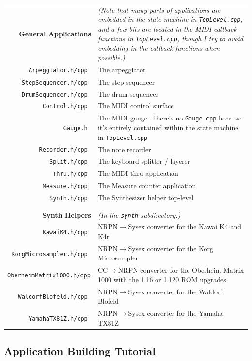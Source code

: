 \documentclass{article}
\begin{document}
\begin{tabular}{r@{\hspace{2em}}p{4.7in}}
	\bf General Applications  &		\it (Note that many parts of applications are embedded
				in the state machine in \texttt{TopLevel.cpp}, and a few bits
				are located in the MIDI callback functions in
				\texttt{TopLevel.cpp}, though I try to avoid embedding
				in the callback functions when possible.)\\
	\tt Arpeggiator.h/cpp & 	The arpeggiator \\ 
	\tt StepSequencer.h/cpp  & 	The step sequencer \\ 
	\tt DrumSequencer.h/cpp  & 	The drum sequencer \\ 
	\tt Control.h/cpp	& 	The MIDI control surface \\ 
	\tt Gauge.h	& 		The MIDI gauge.  There's no \texttt{Gauge.cpp} because it's
				entirely contained within the state machine in
				{\texttt{TopLevel.cpp}} \\ 
	\tt Recorder.h/cpp	& 	The note recorder \\ 
	\tt Split.h/cpp	 & 	The keyboard splitter / layerer \\ 
	\tt Thru.h/cpp & 		The MIDI thru application \\ 
	\tt Measure.h/cpp	& The Measure counter application \\ 
	\tt Synth.h/cpp	& The Synthesizer helper top-level \\ 
\\
\\
	\bf Synth Helpers  & \it (In the \texttt{synth} subdirectory.)\\
	\tt KawaiK4.h/cpp	& 	NRPN\(\rightarrow\)Sysex converter for the Kawai K4 and K4r\\ 
	\tt KorgMicrosampler.h/cpp	& 	NRPN\(\rightarrow\)Sysex converter for the Korg Microsampler\\ 
	\tt OberheimMatrix1000.h/cpp	& 	CC\(\rightarrow\)NRPN converter for the Oberheim Matrix 1000 with the 1.16 or 1.120 ROM upgrades\\ 
	\tt WaldorfBlofeld.h/cpp	& 	NRPN\(\rightarrow\)Sysex converter for the Waldorf Blofeld\\ 
	\tt YamahaTX81Z.h/cpp	& 	NRPN\(\rightarrow\)Sysex converter for the Yamaha TX81Z\\ 
\end{tabular}




\subsection{Application Building Tutorial}
\end{document}
